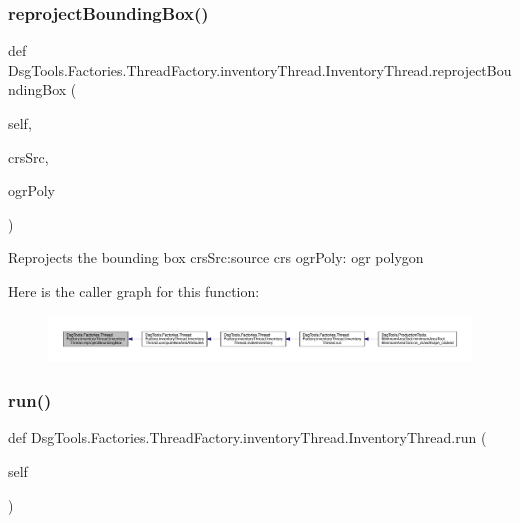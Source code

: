 \subsubsection{\texorpdfstring{reproject\+Bounding\+Box()}{reprojectBoundingBox()}}
{\footnotesize\ttfamily def Dsg\+Tools.\+Factories.\+Thread\+Factory.\+inventory\+Thread.\+Inventory\+Thread.\+reproject\+Bounding\+Box (\begin{DoxyParamCaption}\item[{}]{self,  }\item[{}]{crs\+Src,  }\item[{}]{ogr\+Poly }\end{DoxyParamCaption})}

\begin{DoxyVerb}Reprojects the bounding box
crsSrc:source crs
ogrPoly: ogr polygon
\end{DoxyVerb}
 Here is the caller graph for this function\+:
\nopagebreak
\begin{figure}[H]
\begin{center}
\leavevmode
\includegraphics[width=350pt]{class_dsg_tools_1_1_factories_1_1_thread_factory_1_1inventory_thread_1_1_inventory_thread_a854b1e38ffd3073ea2343a4f8869cac9_icgraph}
\end{center}
\end{figure}
\mbox{\label{class_dsg_tools_1_1_factories_1_1_thread_factory_1_1inventory_thread_1_1_inventory_thread_aa1de63f12022456d0adfcad39c8e7c12}} 
\subsubsection{\texorpdfstring{run()}{run()}}
{\footnotesize\ttfamily def Dsg\+Tools.\+Factories.\+Thread\+Factory.\+inventory\+Thread.\+Inventory\+Thread.\+run (\begin{DoxyParamCaption}\item[{}]{self }\end{DoxyParamCaption})}

